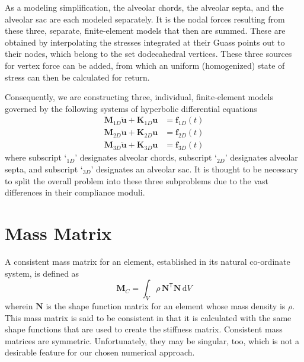As a modeling simplification, the alveolar chords, the alveolar septa, and the alveolar sac are each modeled separately.  It is the nodal forces resulting from these three, separate, finite-element models that then are summed.  These are obtained by interpolating the stresses integrated at their Guass points out to their nodes, which belong to the set dodecahedral vertices.  These three sources for vertex force can be added, from which an uniform (homogenized) state of stress can then be calculated for return.  

Consequently, we are constructing three, individual, finite-element models governed by the following systems of hyperbolic differential equations
\begin{subequations}
    \begin{align}
    \mathbf{M}_{1D} \ddot{\mathbf{u}} + \mathbf{K}_{1D} \mathbf{u} & 
    = \mathbf{f}_{1D}(t) \\
    \mathbf{M}_{2D} \ddot{\mathbf{u}} + \mathbf{K}_{2D} \mathbf{u} & 
    = \mathbf{f}_{2D}(t) \\
    \mathbf{M}_{3D} \ddot{\mathbf{u}} + \mathbf{K}_{3D} \mathbf{u} & 
    = \mathbf{f}_{3D}(t)
    \end{align}
\end{subequations}
where subscript `$\mbox{}_{1D}$' designates alveolar chords, subscript `$\mbox{}_{2D}$' designates alveolar septa, and subscript `$\mbox{}_{3D}$' designates an alveolar sac.  It is thought to be necessary to split the overall problem into these three subproblems due to the vast differences in their compliance moduli.

\section{Mass Matrix}

A consistent mass matrix \cite{Archer65} for an element, established in its natural co-ordinate system, is defined as
\begin{equation}
	\mathbf{M}_{C} = \int_{V} \rho \, \mathbf{N}^{\mathsf{T}} \mathbf{N} \,
	\mathrm{d} V
	\label{consistentMassMatrix}
\end{equation}
wherein $\mathbf{N}$ is the shape function matrix for an element whose mass density is $\rho$.  This mass matrix is said to be consistent in that it is calculated with the same shape functions that are used to create the stiffness matrix.  Consistent mass matrices are symmetric.  Unfortunately, they may be singular, too, which is not a desirable feature for our chosen numerical approach.

